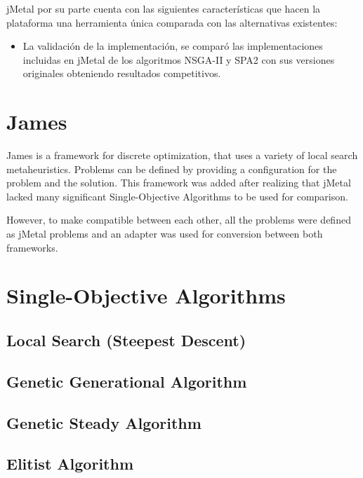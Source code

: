 jMetal por su parte cuenta con las siguientes características que hacen la plataforma una herramienta única comparada con las alternativas existentes:

\begin{itemize}
\item La validación de la implementación, se comparó las implementaciones incluidas en jMetal de los algoritmos NSGA-II y SPA2 con sus versiones originales obteniendo resultados competitivos.\\
\end{itemize}

\section{James}
James is a framework for discrete optimization, that uses a variety of local search metaheuristics. Problems can be defined by providing a configuration for the problem and the solution. This framework was added after realizing that jMetal lacked many significant Single-Objective Algorithms to be used for comparison. 

However, to make compatible between each other, all the problems were defined as jMetal problems and an adapter was used for conversion between both frameworks.


\section{Single-Objective Algorithms}

\subsection{Local Search (Steepest Descent)}
\subsection{Genetic Generational Algorithm}
\subsection{Genetic Steady Algorithm}
\subsection{Elitist Algorithm}
